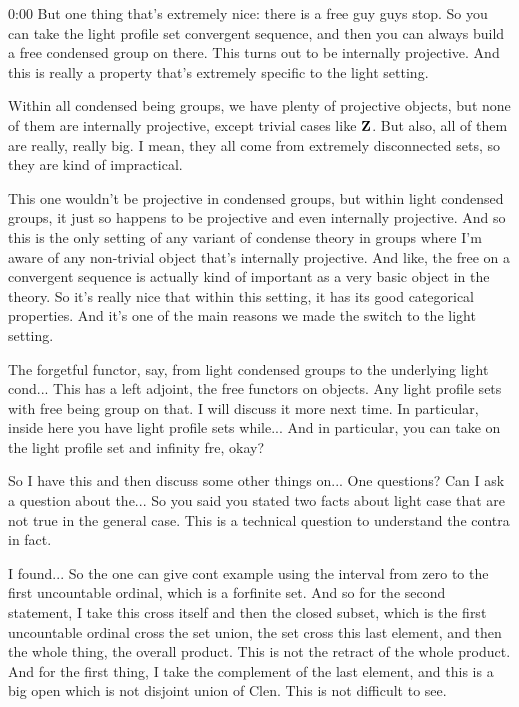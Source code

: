 \begin{unfinished}{0:00}
But one thing that's extremely nice: there is a free guy guys stop. So you can take the light profile set convergent sequence, and then you can always build a free condensed group on there. This turns out to be internally projective. And this is really a property that's extremely specific to the light setting.

Within all condensed being groups, we have plenty of projective objects, but none of them are internally projective, except trivial cases like $\mathbf Z$. But also, all of them are really, really big. I mean, they all come from extremely disconnected sets, so they are kind of impractical.

This one wouldn't be projective in condensed groups, but within light condensed groups, it just so happens to be projective and even internally projective. And so this is the only setting of any variant of condense theory in groups where I'm aware of any non-trivial object that's internally projective. And like, the free on a convergent sequence is actually kind of important as a very basic object in the theory. So it's really nice that within this setting, it has its good categorical properties. And it's one of the main reasons we made the switch to the light setting.

The forgetful functor, say, from light condensed groups to the underlying light cond... This has a left adjoint, the free functors on objects. Any light profile sets with free being group on that. I will discuss it more next time. In particular, inside here you have light profile sets while... And in particular, you can take on the light profile set and infinity fre, okay?

So I have this and then discuss some other things on... One questions? Can I ask a question about the... So you said you stated two facts about light case that are not true in the general case. This is a technical question to understand the contra in fact.

I found... So the one can give cont example using the interval from zero to the first uncountable ordinal, which is a forfinite set. And so for the second statement, I take this cross itself and then the closed subset, which is the first uncountable ordinal cross the set union, the set cross this last element, and then the whole thing, the overall product. This is not the retract of the whole product. And for the first thing, I take the complement of the last element, and this is a big open which is not disjoint union of Clen. This is not difficult to see.


\end{unfinished}
